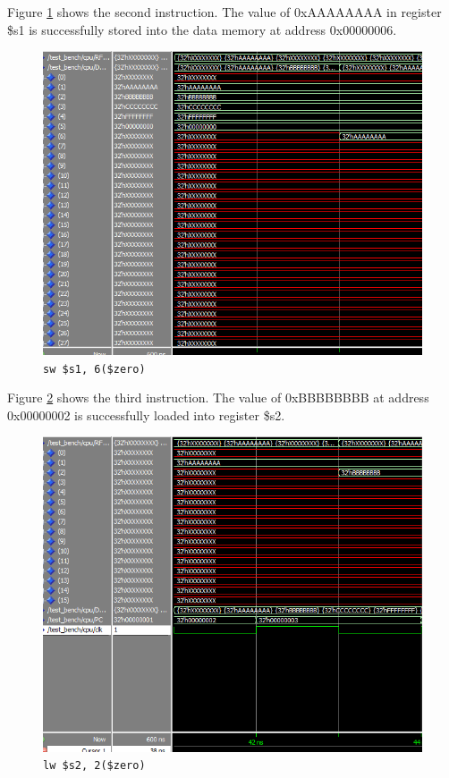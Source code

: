 \documentclass[12pt]{article}
\begin{document}
Figure \ref{fig:2-instr} shows the second instruction. The value of 0xAAAAAAAA in register \$s1 is successfully stored into the data memory at address 0x00000006.
\begin{figure}[h!]
\centering
\includegraphics[width=\linewidth]{simulation/2-instr}
\caption{\texttt{sw \$s1, 6(\$zero)}}
\label{fig:2-instr}
\end{figure}
\clearpage
Figure \ref{fig:3-instr} shows the third instruction. The value of 0xBBBBBBBB at address 0x00000002 is successfully loaded into register \$s2.
\begin{figure}[h!]
\centering
\includegraphics[width=\linewidth]{simulation/3-instr}
\caption{\texttt{lw \$s2, 2(\$zero)}}
\label{fig:3-instr}
\end{figure}
\end{document}
